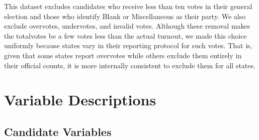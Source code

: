 \documentclass[12pt]{article}
\begin{document}
This dataset excludes candidates who receive less than ten votes in their general election and those who identify Blank or Miscellaneous as their party.
We also exclude overvotes, undervotes, and invalid votes.
Although these removal makes the totalvotes be a few votes less than the actual turnout, we made this choice uniformly because states vary in their reporting protocol for such votes. That is, given that some states report overvotes while others exclude them entirely in their official counts, it is more internally consistent to exclude them for all states.

\clearpage
\section{Variable Descriptions}

\subsection{Candidate Variables}
\end{document}
